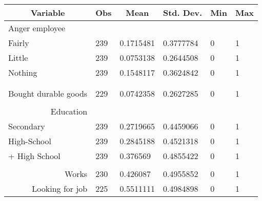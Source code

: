 \begin{tabular}{rrrrrr}
\toprule
\multicolumn{1}{c}{Variable } & \multicolumn{1}{c}{Obs} & \multicolumn{1}{c}{Mean} & \multicolumn{1}{c}{Std. Dev.} & \multicolumn{1}{c}{Min} & \multicolumn{1}{c}{Max} \\
\midrule
\multicolumn{1}{l}{Anger employee} & \multicolumn{1}{c}{} &       &       &       &  \\
\multicolumn{1}{l}{Fairly} & \multicolumn{1}{l}{239} & \multicolumn{1}{l}{0.1715481} & \multicolumn{1}{l}{0.3777784} & \multicolumn{1}{l}{0} & \multicolumn{1}{l}{1} \\
\multicolumn{1}{l}{Little } & \multicolumn{1}{l}{239} & \multicolumn{1}{l}{0.0753138} & \multicolumn{1}{l}{0.2644508} & \multicolumn{1}{l}{0} & \multicolumn{1}{l}{1} \\
\multicolumn{1}{l}{Nothing} & \multicolumn{1}{l}{239} & \multicolumn{1}{l}{0.1548117} & \multicolumn{1}{l}{0.3624842} & \multicolumn{1}{l}{0} & \multicolumn{1}{l}{1} \\
      & \multicolumn{1}{l}{} & \multicolumn{1}{l}{} & \multicolumn{1}{l}{} & \multicolumn{1}{l}{} & \multicolumn{1}{l}{} \\
      & \multicolumn{1}{l}{} & \multicolumn{1}{l}{} & \multicolumn{1}{l}{} & \multicolumn{1}{l}{} & \multicolumn{1}{l}{} \\
Bought durable goods & \multicolumn{1}{l}{229} & \multicolumn{1}{l}{0.0742358} & \multicolumn{1}{l}{0.2627285} & \multicolumn{1}{l}{0} & \multicolumn{1}{l}{1} \\
      & \multicolumn{1}{l}{} & \multicolumn{1}{l}{} & \multicolumn{1}{l}{} & \multicolumn{1}{l}{} & \multicolumn{1}{l}{} \\
Education & \multicolumn{1}{l}{} & \multicolumn{1}{l}{} & \multicolumn{1}{l}{} & \multicolumn{1}{l}{} & \multicolumn{1}{l}{} \\
\multicolumn{1}{l}{Secondary} & \multicolumn{1}{l}{239} & \multicolumn{1}{l}{0.2719665} & \multicolumn{1}{l}{0.4459066} & \multicolumn{1}{l}{0} & \multicolumn{1}{l}{1} \\
\multicolumn{1}{l}{High-School} & \multicolumn{1}{l}{239} & \multicolumn{1}{l}{0.2845188} & \multicolumn{1}{l}{0.4521318} & \multicolumn{1}{l}{0} & \multicolumn{1}{l}{1} \\
\multicolumn{1}{l}{+ High School} & \multicolumn{1}{l}{239} & \multicolumn{1}{l}{0.376569} & \multicolumn{1}{l}{0.4855422} & \multicolumn{1}{l}{0} & \multicolumn{1}{l}{1} \\
      & \multicolumn{1}{l}{} & \multicolumn{1}{l}{} & \multicolumn{1}{l}{} & \multicolumn{1}{l}{} & \multicolumn{1}{l}{} \\
Works & \multicolumn{1}{l}{230} & \multicolumn{1}{l}{0.426087} & \multicolumn{1}{l}{0.4955852} & \multicolumn{1}{l}{0} & \multicolumn{1}{l}{1} \\
Looking for job  & \multicolumn{1}{l}{225} & \multicolumn{1}{l}{0.5511111} & \multicolumn{1}{l}{0.4984898} & \multicolumn{1}{l}{0} & \multicolumn{1}{l}{1} \\
\bottomrule
\end{tabular}%
